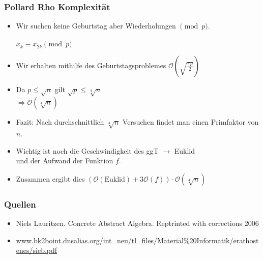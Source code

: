 \documentclass[mathserif, compress, german]{beamer}
\begin{document}
\begin{frame}
  \frametitle{Pollard Rho Komplexit\"at}
  \begin{itemize}
    \item Wir suchen keine Geburtstag aber Wiederholungen $\pmod p$.\\
    \ \\ $x_k \equiv x_{2k} \pmod p$
    \item Wir erhalten mithilfe des Geburtstagsproblemes $\mathcal O(\sqrt{\frac{\pi p}{2}})$
    \item Da $p\leq \sqrt{n}$ gilt $\sqrt{p} \leq \sqrt[4]{n}$\\
	  $\Rightarrow \mathcal O(\sqrt[4]{n})$
    \item Fazit: Nach durchschnittlich $\sqrt[4]{n}$ Versuchen findet man einen Primfaktor von $n$.
    \item Wichtig ist noch die Geschwindigkeit des ggT $\rightarrow$ Euklid\\
          und der Aufwand der Funktion $f$.
    \item Zusammen ergibt dies $(\mathcal O(\text{Euklid})+3\mathcal O(f))\cdot\mathcal O(\sqrt[4]{n})$
  \end{itemize}
\end{frame}

\begin{frame}
\frametitle{Quellen}
  \begin{itemize}
    \item Niels Lauritzen. Concrete Abstract Algebra. Reptrinted with corrections 2006
    \item \url{www.bk2boint.dnsalias.org/int_neu/tl_files/Material\%20Informatik/erathostenes/sieb.pdf}
  \end{itemize}    
\end{frame}
\end{document}
